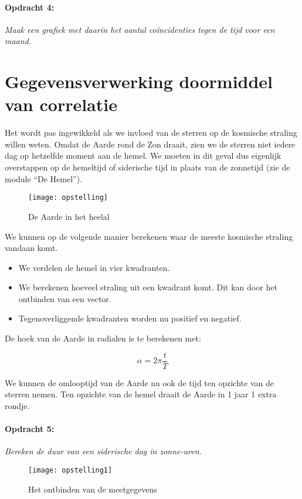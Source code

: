 \paragraph*{Opdracht 4:}

\emph{Maak een grafiek met daarin het aantal coïncidenties tegen de
tijd voor een maand.}


\section{Gegevensverwerking doormiddel van correlatie}

Het wordt pas ingewikkeld als we invloed van de sterren op de kosmische
straling willen weten. Omdat de Aarde rond de Zon draait, zien we
de sterren niet iedere dag op hetzelfde moment aan de hemel. We moeten
in dit geval dus eigenlijk overstappen op de hemeltijd of siderische
tijd in plaats van de zonnetijd (zie de module ``De Hemel'').

\begin{figure}[h]
    \centering
    \texttt{[image: opstelling]}
    \caption{De Aarde in het heelal}
\end{figure}


We kunnen op de volgende manier berekenen waar de meeste kosmische
straling vandaan komt.
\begin{itemize}
\item We verdelen de hemel in vier kwadranten.
\item We berekenen hoeveel straling uit een kwadrant komt. Dit kan door
het ontbinden van een vector.
\item Tegenoverliggende kwadranten worden nu positief en negatief.
\end{itemize}
De hoek van de Aarde in radialen is te berekenen met:

\begin{equation}
\alpha=2\pi\frac{t}{T}
\end{equation}


We kunnen de omlooptijd van de Aarde nu ook de tijd ten opzichte van
de sterren nemen. Ten opzichte van de hemel draait de Aarde in 1 jaar
1 extra rondje.


\paragraph*{Opdracht 5:}

\emph{Bereken de duur van een siderische dag in zonne-uren.}

\begin{figure}[h]
    \centering
    \texttt{[image: opstelling1]}
    \caption{Het ontbinden van de meetgegevens}
\end{figure}



